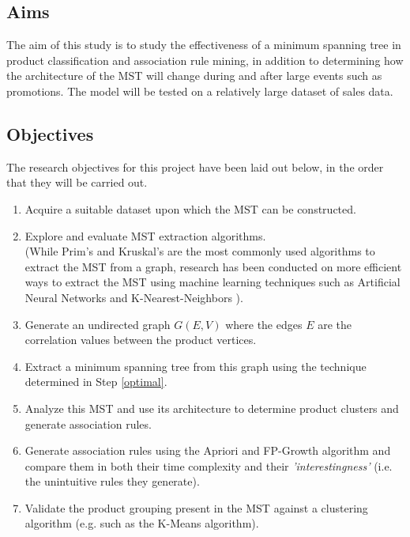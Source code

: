 \documentclass[a4paper,11pt]{article}
\begin{document}
\subsection{Aims}
The aim of this study is to study the effectiveness of a minimum spanning tree in product classification and association rule mining,  in addition to determining how the architecture of the MST will change during and after large events such as promotions. The model will be tested on a relatively large dataset of sales data.

\subsection{Objectives}
The research objectives for this project have been laid out below, in the order that they will be carried out.
\begin{enumerate}
\item Acquire a suitable dataset upon which the MST can be constructed.

\item \label{optimal} Explore and evaluate MST extraction algorithms.
\\(While Prim's \cite{prims}\cite{prims_og} and Kruskal's \cite{kruskal} are the most commonly used algorithms to extract the MST from a graph, research has been conducted on more efficient ways to extract the MST using machine learning techniques such as Artificial Neural Networks \cite{ann_mst} and K-Nearest-Neighbors \cite{knn_mst}).

\item Generate an undirected graph $G(E,V)$ where the edges $E$ are the correlation values between the product vertices.

\item Extract a minimum spanning tree from this graph using the technique determined in Step \ref{optimal}. 

\item Analyze this MST and use its architecture to determine product clusters and generate association rules.

\item Generate association rules using the Apriori and FP-Growth algorithm and compare them in both their time complexity and their \textit{'interestingness'} (i.e. the unintuitive rules they generate).

\item Validate the product grouping present in the MST against a clustering algorithm (e.g.  such as the K-Means algorithm).

\end{enumerate}
%
%
%
%


\newpage
\printbibliography
\end{document}
